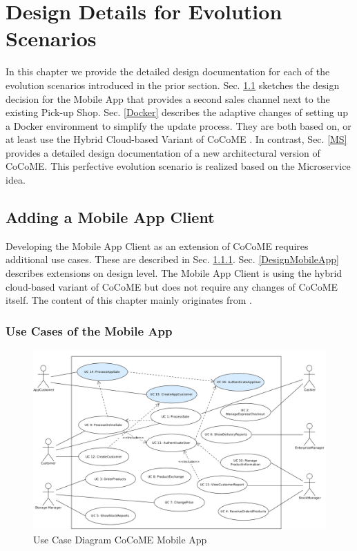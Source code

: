 \chapter{Design Details for Evolution Scenarios}
In this chapter we provide the detailed design documentation for each of the evolution scenarios
introduced in the prior section. Sec. \ref{App} sketches the design decision for the Mobile App that provides a second sales channel next to the existing Pick-up Shop. Sec. \ref{Docker} describes the adaptive changes of setting up a Docker environment to simplify the update process. They are both based on, or at least use the Hybrid Cloud-based Variant of CoCoME \cite{SWB-469002735}. In contrast, Sec. \ref{MS} provides a detailed design documentation of a new architectural version of CoCoME. This perfective evolution scenario is realized based on the Microservice idea.

\section{Adding a Mobile App Client} \label{App} %
Developing the Mobile App Client as an extension of CoCoME requires additional use cases. These are described in Sec. \ref{UseCasesMobileApp}. Sec. \ref{DesignMobileApp} describes extensions on design level. The Mobile App Client is using the hybrid cloud-based variant of CoCoME but does not require any changes of CoCoME itself. The content of this chapter mainly originates from \cite{schnabel}.
\subsection{Use Cases of the Mobile App}\label{UseCasesMobileApp}
		\begin{figure}[t]
			\includegraphics[width=\textwidth]{img/UseCaseApp.png}
			\caption{Use Case Diagram CoCoME Mobile App}
		\end{figure}

